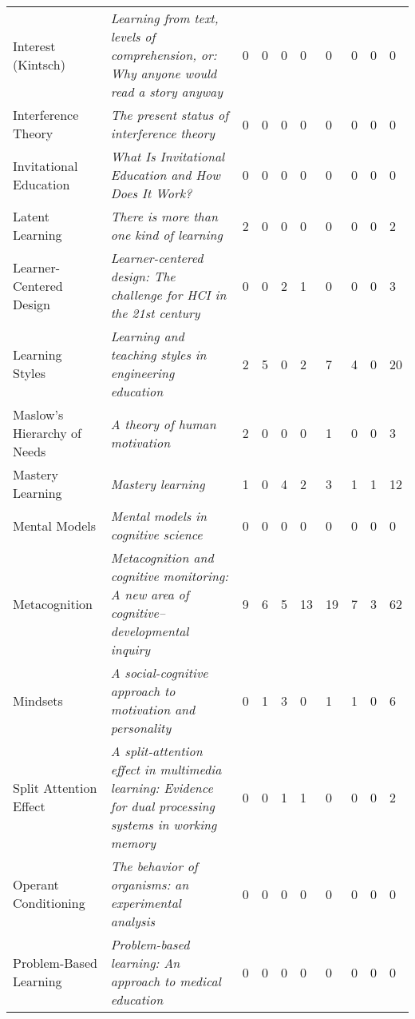 \begin{table*}[t]
\begin{tabular}{p{3cm}p{7cm}llllllll}
Interest (Kintsch) & \textit{Learning from text, levels of comprehension, or: Why anyone would read a story anyway}~\cite{kintsch1980learning} & 0 & 0 & 0 & 0 & 0 & 0 & 0 & 0\\
Interference Theory & \textit{The present status of interference theory}~\cite{postman1961present} & 0 & 0 & 0 & 0 & 0 & 0 & 0 & 0\\
Invitational Education & \textit{What Is Invitational Education and How Does It Work?}~\cite{purkey1991invitational} & 0 & 0 & 0 & 0 & 0 & 0 & 0 & 0\\
Latent Learning & \textit{There is more than one kind of learning}~\cite{tolman1949there} & 2 & 0 & 0 & 0 & 0 & 0 & 0 & 2\\
Learner-Centered Design & \textit{Learner-centered design: The challenge for HCI in the 21st century}~\cite{soloway1994learner} & 0 & 0 & 2 & 1 & 0 & 0 & 0 & 3\\
Learning Styles & \textit{Learning and teaching styles in engineering education}~\cite{felder1988learning} & 2 & 5 & 0 & 2 & 7 & 4 & 0 & 20\\
Maslow’s Hierarchy of Needs & \textit{A theory of human motivation}~\cite{maslow1943theory} & 2 & 0 & 0 & 0 & 1 & 0 & 0 & 3\\
Mastery Learning & \textit{Mastery learning}~\cite{bloom1971mastery} & 1 & 0 & 4 & 2 & 3 & 1 & 1 & 12\\
Mental Models & \textit{Mental models in cognitive science}~\cite{johnson1980mental} & 0 & 0 & 0 & 0 & 0 & 0 & 0 & 0\\
Metacognition & \textit{Metacognition and cognitive monitoring: A new area of cognitive--developmental inquiry}~\cite{flavell1979metacognition} & 9 & 6 & 5 & 13 & 19 & 7 & 3 & 62\\
Mindsets & \textit{A social-cognitive approach to motivation and personality}~\cite{dweck1988social} & 0 & 1 & 3 & 0 & 1 & 1 & 0 & 6\\
Split Attention Effect & \textit{A split-attention effect in multimedia learning: Evidence for dual processing systems in working memory}~\cite{mayer1998split} & 0 & 0 & 1 & 1 & 0 & 0 & 0 & 2\\
Operant Conditioning & \textit{The behavior of organisms: an experimental analysis}~\cite{skinner1938behavior} & 0 & 0 & 0 & 0 & 0 & 0 & 0 & 0\\
Problem-Based Learning  & \textit{Problem-based learning: An approach to medical education}~\cite{barrows1980problem} & 0 & 0 & 0 & 0 & 0 & 0 & 0 & 0\\

\end{tabular}
\end{table*}
